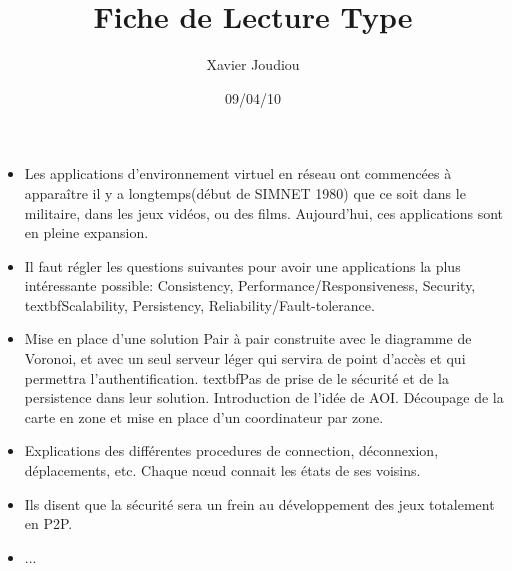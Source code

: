 \documentclass[11pt,a4paper]{article}
\title{Fiche de Lecture Type}
\author{Xavier Joudiou}
\date{09/04/10}
\begin{document}
	
  \begin{itemize}
  \renewcommand{\labelitemi}{$\Rightarrow$}
	\item Les applications d'environnement virtuel en réseau ont commencées à apparaître il y a longtemps(début de SIMNET 1980) que ce soit dans le militaire, dans les jeux vidéos, ou des films. Aujourd'hui, ces applications sont en pleine expansion.
	\item Il faut régler les questions suivantes pour avoir une applications la plus intéressante possible: Consistency, Performance/Responsiveness, Security, textbf{Scalability}, Persistency, Reliability/Fault-tolerance. 
	\item Mise en place d'une solution Pair à pair construite avec le diagramme de Voronoi, et avec un seul serveur léger qui servira de point d'accès et qui permettra l'authentification. textbf{Pas de prise de le sécurité et de la persistence dans leur solution}. Introduction de l'idée de AOI. Découpage de la carte en zone et mise en place d'un coordinateur par zone.
	\item Explications des différentes procedures de connection, déconnexion, déplacements, etc. Chaque nœud connait les états de ses voisins.
	\item Ils disent que la sécurité sera un frein au développement des jeux totalement en P2P.
	\item ...
  \end{itemize}
\end{document}
